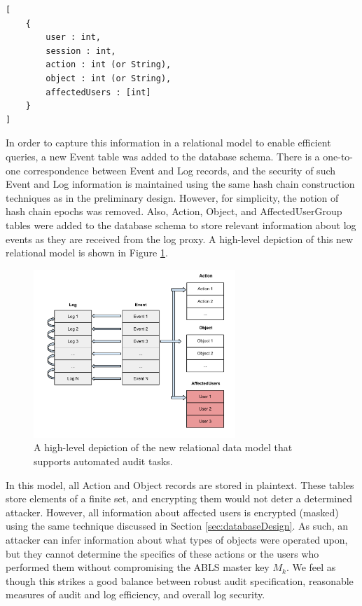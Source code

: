\documentclass{sig-alternate}
\begin{document}
\begin{lstlisting}
[
    {
        user : int,
        session : int,
        action : int (or String),
        object : int (or String),
        affectedUsers : [int]
    }
]
\end{lstlisting}

In order to capture this information in a relational model to enable efficient queries, a new Event table was added
to the database schema. There is a one-to-one correspondence between Event 
and Log records, and the security of such Event
and Log information is maintained using the same hash chain construction techniques as in the preliminary design.
However, for simplicity, the notion of hash chain epochs was removed.
Also, Action, Object, and AffectedUserGroup tables were added to the database schema to store relevant information
about log events as they are received from the log proxy. A high-level depiction of this new relational model is shown
in Figure \ref{fig:design2}.

\begin{figure}[ht!]
\begin{center}
\includegraphics[width=3in]{images/relational_design_v2.pdf}
\caption{A high-level depiction of the new relational data model that supports automated audit tasks.}
\label{fig:design2}
\end{center}
\end{figure}

In this model, all Action and Object records are stored in plaintext. These tables store elements of a finite set, and
encrypting them would not deter a determined attacker. However, all information about affected users is encrypted 
(masked) using the same technique discussed in Section \ref{sec:databaseDesign}. As such, an attacker can infer
information about what types of objects were operated upon, but they cannot determine the specifics of these actions
or the users who performed them without compromising the ABLS master key $M_k$. We feel as though this strikes
a good balance between robust audit specification, reasonable measures of audit and log efficiency, and overall 
log security. 
\end{document}
